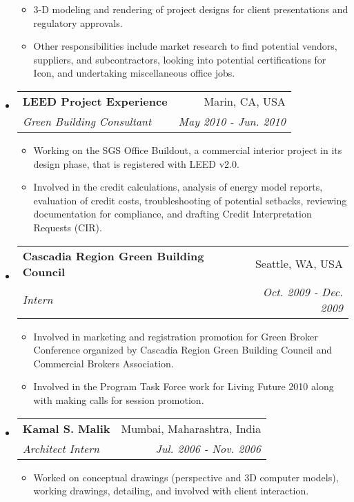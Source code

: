 \documentclass[letterpaper,10pt]{article}
\makeatletter
\newcommand{\resitem}[1]{\item #1}
\newcommand{\ressubheading}[4]{
\begin{tabular*}{7in}{l@{\extracolsep{\fill}}r}
		\textbf{#1} & #2 \\
		\textit{#3} & \textit{#4} \\
\end{tabular*}}
\makeatother
\begin{document}
\begin{itemize}
\begin{itemize}
   \resitem{3-D modeling and rendering of project designs for client presentations and regulatory approvals.}
   \resitem{Other responsibilities include market research to find potential vendors, suppliers, and subcontractors, looking into potential certifications for Icon, and undertaking miscellaneous office jobs.}
  \end{itemize}
     \pagebreak
\item
  \ressubheading{LEED Project Experience}{Marin, CA, USA}{Green Building Consultant}{May 2010 - Jun. 2010}
  \begin{itemize}
    \resitem{Working on the SGS Office Buildout, a commercial interior project in its design phase, that is registered with LEED v2.0.}
    \resitem{Involved in the credit calculations, analysis of energy model reports, evaluation of credit costs, troubleshooting of potential setbacks, reviewing documentation for compliance, and drafting Credit Interpretation Requests (CIR).}
  \end{itemize}

\item
  \ressubheading{Cascadia Region Green Building Council}{Seattle, WA, USA}{Intern}{Oct. 2009 - Dec. 2009}
  \begin{itemize}
    \resitem{Involved in marketing and registration promotion for Green Broker Conference organized by Cascadia Region Green Building Council and Commercial Brokers Association.}
    \resitem{Involved in the Program Task Force work for Living Future 2010 along with making calls for session promotion.}
  \end{itemize}
\item
  \ressubheading{Kamal S. Malik}{Mumbai, Maharashtra, India}{Architect Intern}{Jul. 2006 - Nov. 2006}
  \begin{itemize}
    \resitem{Worked on conceptual drawings (perspective and 3D computer models), working drawings, detailing, and involved with client interaction.}
  \end{itemize}
  
\end{itemize}
\end{document}
